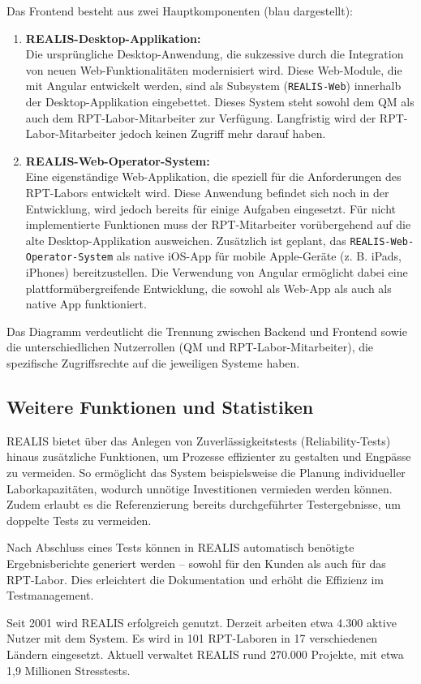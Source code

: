 Das Frontend besteht aus zwei Hauptkomponenten (blau dargestellt):
\begin{enumerate}
    \item \textbf{REALIS-Desktop-Applikation:} \\
Die ursprüngliche Desktop-Anwendung, die sukzessive durch die Integration von neuen Web-Funktionalitäten modernisiert wird. Diese Web-Module, die mit Angular entwickelt werden, sind als Subsystem (\texttt{REALIS-Web}) innerhalb der Desktop-Applikation eingebettet. Dieses System steht sowohl dem \gls{QM} als auch dem \gls{RPT}-Labor-Mitarbeiter zur Verfügung. Langfristig wird der \gls{RPT}-Labor-Mitarbeiter jedoch keinen Zugriff mehr darauf haben.

\item \textbf{REALIS-Web-Operator-System:} \\
Eine eigenständige Web-Applikation, die speziell für die Anforderungen des \gls{RPT}-Labors entwickelt wird. Diese Anwendung befindet sich noch in der Entwicklung, wird jedoch bereits für einige Aufgaben eingesetzt. Für nicht implementierte Funktionen muss der \gls{RPT}-Mitarbeiter vorübergehend auf die alte Desktop-Applikation ausweichen. Zusätzlich ist geplant, das \texttt{REALIS-Web-Operator-System} als native iOS-App für mobile Apple-Geräte (z. B. iPads, iPhones) bereitzustellen. Die Verwendung von Angular ermöglicht dabei eine plattformübergreifende Entwicklung, die sowohl als Web-App als auch als native App funktioniert.
\end{enumerate}

Das Diagramm verdeutlicht die Trennung zwischen Backend und Frontend sowie die unterschiedlichen Nutzerrollen (\gls{QM} und \gls{RPT}-Labor-Mitarbeiter), die spezifische Zugriffsrechte auf die jeweiligen Systeme haben.


\subsection{Weitere Funktionen und Statistiken}
\gls{REALIS} bietet über das Anlegen von Zuverlässigkeitstests (Reliability-Tests) hinaus zusätzliche Funktionen, um Prozesse effizienter zu gestalten und Engpässe zu vermeiden. So ermöglicht das System beispielsweise die Planung individueller Laborkapazitäten, wodurch unnötige Investitionen vermieden werden können. Zudem erlaubt es die Referenzierung bereits durchgeführter Testergebnisse, um doppelte Tests zu vermeiden.

Nach Abschluss eines Tests können in \gls{REALIS} automatisch benötigte Ergebnisberichte generiert werden – sowohl für den Kunden als auch für das \gls{RPT}-Labor. Dies erleichtert die Dokumentation und erhöht die Effizienz im Testmanagement.

Seit 2001 wird \gls{REALIS} erfolgreich genutzt. Derzeit arbeiten etwa 4.300 aktive Nutzer mit dem System. Es wird in 101 \gls{RPT}-Laboren in 17 verschiedenen Ländern eingesetzt. Aktuell verwaltet \gls{REALIS} rund 270.000 Projekte, mit etwa 1,9 Millionen Stresstests.